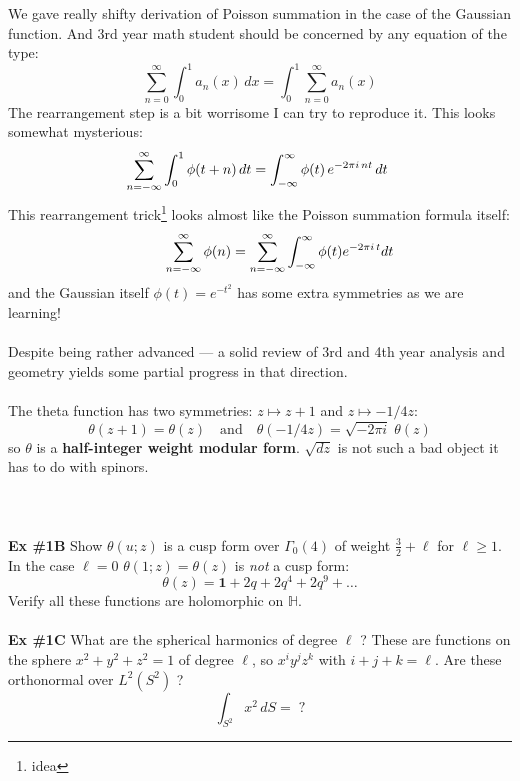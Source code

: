 \documentclass[12pt]{article}
\begin{document}
\newpage

\noindent We gave really shifty derivation of Poisson summation in the case of the Gaussian function.  And 3rd year math student should be concerned by any equation of the type:
$$ \sum_{n=0}^\infty \int_0^1 a_n(x) \, dx = 
\int_0^1 \sum_{n=0}^\infty a_n(x) $$
The rearrangement step is a bit worrisome I can try to reproduce it.  This looks somewhat mysterious:
$$\hspace{-0.05in} \sum_{n=-\infty}^\infty \int_0^1 \phi(t + n ) \, dt = \int_{-\infty}^\infty \phi(t) \, e^{-2\pi i\, nt} \, dt $$
This rearrangement trick\footnote{idea} looks almost like the Poisson summation formula itself:
$$ \hspace{0.4in}\sum_{n = - \infty}^\infty \phi(n) = \sum_{n = - \infty}^\infty \int_{-\infty}^\infty \phi(t) e^{- 2\pi i\, t} dt $$
and the Gaussian itself $\phi(t) = e^{-t^2}$ has some extra symmetries as we are learning!  \\ \\
Despite being rather advanced --- a solid review of 3rd and 4th year analysis and geometry yields some partial progress in that direction. \\ \\
The theta function has two symmetries: $z \mapsto z + 1$ and $z \mapsto -1/4z$: 
$$ \theta(z + 1) = \theta(z) \quad\text{and}\quad \theta(-1/4z) = \sqrt{-2\pi i}\;\theta(z) $$
so $\theta$ is a \textbf{half-integer weight  modular form}.  $\sqrt{dz}$ is not such a bad object it has to do with spinors. \\ \\ \\ \\
\textbf{Ex \#1B} Show $\theta(u; z)$ is a cusp form over $\Gamma_0(4)$ of weight $\frac{3}{2} + \ell$ for $\ell \geq 1$.  In the case $\ell = 0$ $\theta(1; z) = \theta(z)$ is \textit{not} a cusp form:
$$ \theta(z) = \mathbf{1} + 2q + 2q^4 + 2q^9 + \dots $$
Verify all these functions are holomorphic on $\mathbb{H}$. \\ \\
\textbf{Ex \#1C} What are the spherical harmonics of degree $\ell$ ? These are functions on the sphere $x^2 + y^2 + z^2 = 1$ of degree $\ell$, so $ x^i y^j z^k$ with $ i + j + k = \ell$.  Are these orthonormal over $L^2 (S^2)$ ?  
$$ \int_{S^2} x^2 \, dS = \;? $$

\newpage 

\selectfont \fontsize{12}{10}\selectfont
\end{document}
